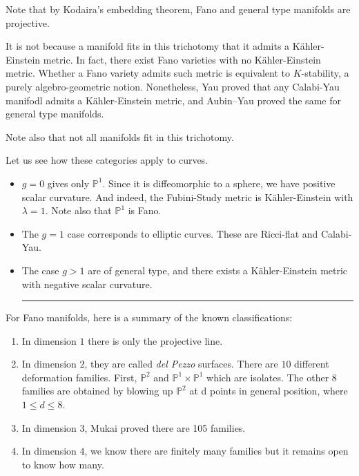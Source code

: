 \documentclass[11pt]{amsart}
\newcommand{\bP}{\mathbb{P}}
\newif\ifqedbarused
\newcommand{\qedbar}{%
  \unskip\nobreak\hfill %
  \hspace{1em} %
  \rule{3em}{0.4pt} %
}
\newcommand{\qedbarhere}{%
  \qedbar%
  \global\qedbarusedtrue%
}
\theoremstyle{definition}
\numberwithin{equation}{section}
\begin{document}
Note that by Kodaira's embedding theorem, Fano and general type manifolds are projective.
\begin{caution}
	It is not because a manifold fits in this trichotomy that it admits a Kähler-Einstein metric. In fact, there exist Fano varieties with no Kähler-Einstein metric. Whether a Fano variety admits such metric is equivalent to $K$-stability, a purely algebro-geometric notion. Nonetheless, Yau proved that any Calabi-Yau manifodl admits a Kähler-Einstein metric, and Aubin--Yau proved the same for general type manifolds.
	
	Note also that not all manifolds fit in this trichotomy. 
\end{caution}
\begin{example}[Curves]
Let us see how these categories apply to curves.
\begin{itemize}
	\item $g=0$ gives only $\bP^1$. Since it is diffeomorphic to a sphere, we have positive scalar curvature. And indeed, the Fubini-Study metric is Kähler-Einstein with $\lambda=1$. Note also that $\bP^1$ is Fano.
	\item The $g=1$ case corresponds to elliptic curves. These are Ricci-flat and Calabi-Yau.
	\item The case $g>1$ are of general type, and there exists a Kähler-Einstein metric with negative scalar curvature.\qedbarhere
\end{itemize}
\end{example}
For Fano manifolds, here is a summary of the known classifications:
\begin{enumerate}
	\item In dimension $1$ there is only the projective line.
	\item In dimension $2$, they are called \emph{del Pezzo} surfaces. There are $10$ different deformation families. First, $\bP^2$ and $\bP^1\times\bP^1$ which are isolates. The other $8$ families are obtained by blowing up $\bP^2$ at d points in general position, where $1\leq d\leq 8$.
	\item In dimension $3$, Mukai proved there are 105 families.
	\item In dimension $4$, we know there are finitely many families but it remains open to know how many.
\end{enumerate}
\end{document}
